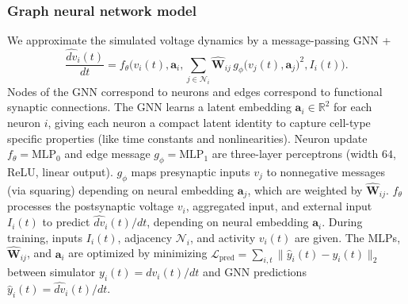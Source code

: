 \documentclass[12pt,twocolumn]{article}
\begin{document}
\subsubsection*{Graph neural network model}
We approximate the simulated voltage dynamics by a message-passing GNN \cite{gilmer_neural_2017}
\small%
+\begin{equation*}
\frac{\widehat{dv}_i(t)}{dt}
=f_\theta\Big(
v_i(t),\mathbf{a}_i,
\sum_{j\in\mathcal{N}_i} \widehat{\mathbf{W}}_{ij}\,g_\phi\!\big(v_j(t),\mathbf{a}_j\big)^2,
I_i(t)\Big)\mathrm{.}
\label{eq:gnn_ct}
\end{equation*}
\normalsize%
Nodes of the GNN correspond to neurons and edges correspond to functional synaptic connections. The GNN learns a latent embedding $\mathbf{a}_i\in\mathbb{R}^2$ for each neuron $i$, giving each neuron a compact latent identity to capture cell-type specific properties (like time constants and nonlinearities).  Neuron update $f_\theta=\text{MLP}_0$ and edge message $g_\phi=\text{MLP}_1$ are three-layer perceptrons (width $64$, ReLU, linear output). $g_\phi$ maps presynaptic inputs $v_j$ to nonnegative messages (via squaring) depending on neural embedding $\mathbf{a}_j$, which are weighted by $\widehat{\mathbf{W}}_{ij}$. $f_\theta$ processes the postsynaptic voltage $v_i$, aggregated input, and external input $I_i(t)$ to predict $\widehat{dv}_i(t)/d t$, depending on neural embedding $\mathbf{a}_i$. During training, inputs $I_i(t)$, adjacency $\mathcal{N}_i$, and activity $v_i(t)$ are given. The $\mathrm{MLP}$s, $\widehat{\mathbf{W}}_{ij}$, and $\mathbf{a}_i$ 
are optimized by minimizing $\mathcal{L}_{\mathrm{pred}}
= \sum_{i,t}
\|
\widehat{y}_i(t) - y_i(t)
\|_2$ between simulator 
$y_i(t)=dv_i(t)/dt$ and GNN predictions $\widehat{y}_i(t) = \widehat{dv}_i(t)/dt$.
\vspace*{-1.em}
\end{document}
